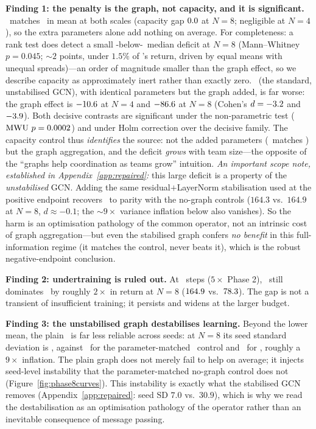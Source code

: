 \textbf{Finding 1: the penalty is the graph, not capacity, and it is
significant.} \mlpqmix\ matches \qmix\ in mean at both scales (capacity gap
$0.0$ at $N=8$; negligible at $N=4$), so the extra parameters
alone add nothing on average. For completeness: a rank test does detect a
small \mlpqmix-below-\qmix\ median deficit at $N{=}8$ (Mann--Whitney
$p=0.045$; ${\sim}2$ points, under $1.5\%$ of \qmix's return, driven by
equal means with unequal spreads)---an order of magnitude smaller than the
graph effect, so we describe capacity as approximately inert rather than
exactly zero. \gnnqmix\ (the standard, unstabilised GCN), with identical
parameters but the graph added, is far worse: the graph effect is
$-10.6$ at $N=4$ and
$-86.6$ at $N=8$ (Cohen's $d=-3.2$ and
$-3.9$). Both decisive contrasts are significant under the
non-parametric test ($\text{MWU } p=0.0002$) and under Holm correction
over the decisive family. The capacity control thus \emph{identifies} the
source: not the added parameters (\mlpqmix\ matches \qmix) but the graph
aggregation, and the deficit \emph{grows} with team size---the opposite of
the ``graphs help coordination as teams grow'' intuition. \emph{An important
scope note, established in Appendix~\ref{app:repaired}:} this large deficit
is a property of the \emph{unstabilised} GCN. Adding the same residual$+$LayerNorm
stabilisation used at the positive endpoint recovers \gnnqmix\ to parity
with the no-graph controls ($164.3$ vs.\ $164.9$ at $N{=}8$, $d\approx-0.1$;
the ${\sim}9\times$ variance inflation below also vanishes). So the harm is
an optimisation pathology of the common operator, not an intrinsic cost of
graph aggregation---but even the stabilised graph confers \emph{no benefit}
in this full-information regime (it matches the control, never beats it),
which is the robust negative-endpoint conclusion.

\textbf{Finding 2: undertraining is ruled out.} At \PEsteps\ steps
($5\times$ Phase 2), \qmix\ still dominates \gnnqmix\ by roughly $2\times$
in return at $N=8$ ($164.9$ vs.\ $78.3$). The gap is not a
transient of insufficient training; it persists and widens at the larger
budget.

\textbf{Finding 3: the unstabilised graph destabilises learning.} Beyond the
lower mean, the plain \gnnqmix\ is far less reliable across seeds: at $N=8$ its
seed standard deviation is \PEgnnSDNeight, against \PEmlpSDNeight\ for the
parameter-matched \mlpqmix\ control and \PEqmixSDNeight\ for \qmix, roughly a
$9\times$ inflation. The plain graph
does not merely fail to help on average; it injects seed-level
instability that the parameter-matched no-graph control does not
(Figure~\ref{fig:phase8curves}). This instability is exactly what the
stabilised GCN removes (Appendix~\ref{app:repaired}: seed SD $7.0$ vs.\
$30.9$), which is why we read the destabilisation as an optimisation
pathology of the operator rather than an inevitable consequence of message
passing.

